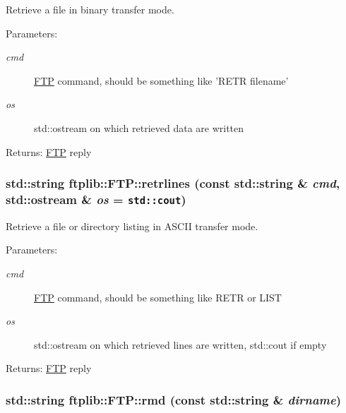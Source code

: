 Retrieve a file in binary transfer mode. 

\begin{Desc}
\item[Parameters:]
\begin{description}
\item[{\em cmd}]\hyperlink{classftplib_1_1FTP}{FTP} command, should be something like 'RETR filename' \item[{\em os}]std::ostream on which retrieved data are written \end{description}
\end{Desc}
\begin{Desc}
\item[Returns:]\hyperlink{classftplib_1_1FTP}{FTP} reply \end{Desc}
\hypertarget{classftplib_1_1FTP_b04e374d4835e124959cee085df3fa4e}{
\subsubsection[{retrlines}]{\setlength{\rightskip}{0pt plus 5cm}std::string ftplib::FTP::retrlines (const std::string \& {\em cmd}, \/  std::ostream \& {\em os} = {\tt std::cout})}}
\label{classftplib_1_1FTP_b04e374d4835e124959cee085df3fa4e}


Retrieve a file or directory listing in ASCII transfer mode. 

\begin{Desc}
\item[Parameters:]
\begin{description}
\item[{\em cmd}]\hyperlink{classftplib_1_1FTP}{FTP} command, should be something like RETR or LIST \item[{\em os}]std::ostream on which retrieved lines are written, std::cout if empty \end{description}
\end{Desc}
\begin{Desc}
\item[Returns:]\hyperlink{classftplib_1_1FTP}{FTP} reply \end{Desc}
\hypertarget{classftplib_1_1FTP_2a96ea655350a479cdf5f34254fd4ac8}{
\subsubsection[{rmd}]{\setlength{\rightskip}{0pt plus 5cm}std::string ftplib::FTP::rmd (const std::string \& {\em dirname})}}
\label{classftplib_1_1FTP_2a96ea655350a479cdf5f34254fd4ac8}


